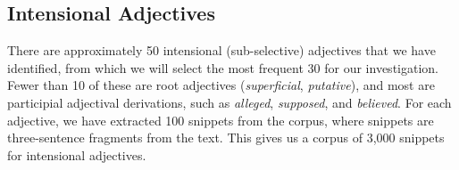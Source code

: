 \documentclass[10pt]{article}
\begin{document}
%
%
%
%
%

\vspace{-.1in}
\subsection{Intensional Adjectives}
There are approximately 50 intensional (sub-selective) adjectives that we have identified, from which we will select the most frequent 30 for our investigation. Fewer than 10 of these are root adjectives ({\it superficial}, {\it putative}), and most are participial adjectival derivations, such as {\it alleged}, {\it supposed}, and {\it believed}. For each adjective, we have extracted 100 snippets from the corpus, where snippets are three-sentence fragments from the text. This gives us a corpus of 3,000 snippets for intensional adjectives. 
\end{document}
